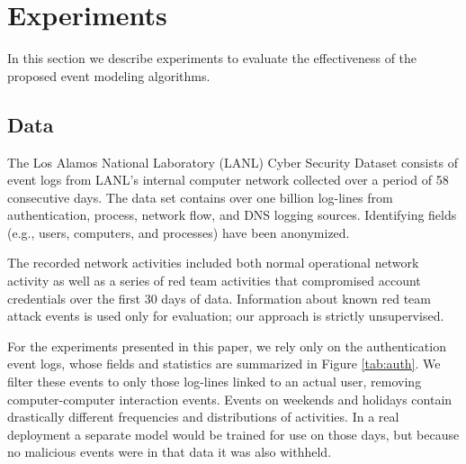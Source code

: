 \documentclass[letterpaper]{article} %
\begin{document}
\section{Experiments}
In this section we describe experiments to evaluate the effectiveness of the proposed event modeling algorithms.
\subsection{Data}

The Los Alamos National Laboratory (LANL) Cyber Security Dataset \cite{kent2016cyber} consists of event logs from LANL's  internal computer network collected over a period of 58 consecutive days. The data set contains over one billion log-lines from  authentication, process, network flow, and DNS logging sources. Identifying fields (e.g., users, computers, and processes) have been anonymized.

The recorded network activities included both normal operational network activity as well as a series of red team activities that compromised account credentials over the first 30 days of data.
Information about known red team attack events is used only for evaluation; our approach is strictly unsupervised.

For the experiments presented in this paper, we rely only on the authentication event logs, whose fields and statistics are summarized in Figure \ref{tab:auth}.  We  filter these events to only those log-lines linked to an actual user, removing computer-computer interaction events. Events on weekends and holidays contain drastically different frequencies and distributions of activities.  In a real deployment a separate model would be trained for use on those days, but because no malicious events were in that data it was also withheld.
\end{document}
